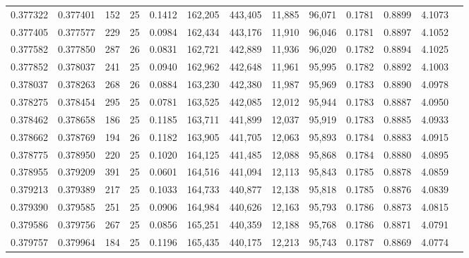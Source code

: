 \begin{tabular}{rrrrrrrrrrrrr}
0.377322 & 0.377401 & 152 &  25 &                                     0.1412 & 162,205 & 443,405 &  11,885 &  96,071 & 0.1781 & 0.8899 & 4.1073 \\
0.377405 & 0.377577 & 229 &  25 &                                     0.0984 & 162,434 & 443,176 &  11,910 &  96,046 & 0.1781 & 0.8897 & 4.1052 \\
0.377582 & 0.377850 & 287 &  26 &                                     0.0831 & 162,721 & 442,889 &  11,936 &  96,020 & 0.1782 & 0.8894 & 4.1025 \\
0.377852 & 0.378037 & 241 &  25 &                                     0.0940 & 162,962 & 442,648 &  11,961 &  95,995 & 0.1782 & 0.8892 & 4.1003 \\
0.378037 & 0.378263 & 268 &  26 &                                     0.0884 & 163,230 & 442,380 &  11,987 &  95,969 & 0.1783 & 0.8890 & 4.0978 \\
0.378275 & 0.378454 & 295 &  25 &                                     0.0781 & 163,525 & 442,085 &  12,012 &  95,944 & 0.1783 & 0.8887 & 4.0950 \\
0.378462 & 0.378658 & 186 &  25 &                                     0.1185 & 163,711 & 441,899 &  12,037 &  95,919 & 0.1783 & 0.8885 & 4.0933 \\
0.378662 & 0.378769 & 194 &  26 &                                     0.1182 & 163,905 & 441,705 &  12,063 &  95,893 & 0.1784 & 0.8883 & 4.0915 \\
0.378775 & 0.378950 & 220 &  25 &                                     0.1020 & 164,125 & 441,485 &  12,088 &  95,868 & 0.1784 & 0.8880 & 4.0895 \\
0.378955 & 0.379209 & 391 &  25 &                                     0.0601 & 164,516 & 441,094 &  12,113 &  95,843 & 0.1785 & 0.8878 & 4.0859 \\
0.379213 & 0.379389 & 217 &  25 &                                     0.1033 & 164,733 & 440,877 &  12,138 &  95,818 & 0.1785 & 0.8876 & 4.0839 \\
0.379390 & 0.379585 & 251 &  25 &                                     0.0906 & 164,984 & 440,626 &  12,163 &  95,793 & 0.1786 & 0.8873 & 4.0815 \\
0.379586 & 0.379756 & 267 &  25 &                                     0.0856 & 165,251 & 440,359 &  12,188 &  95,768 & 0.1786 & 0.8871 & 4.0791 \\
0.379757 & 0.379964 & 184 &  25 &                                     0.1196 & 165,435 & 440,175 &  12,213 &  95,743 & 0.1787 & 0.8869 & 4.0774 \\

\end{tabular}
